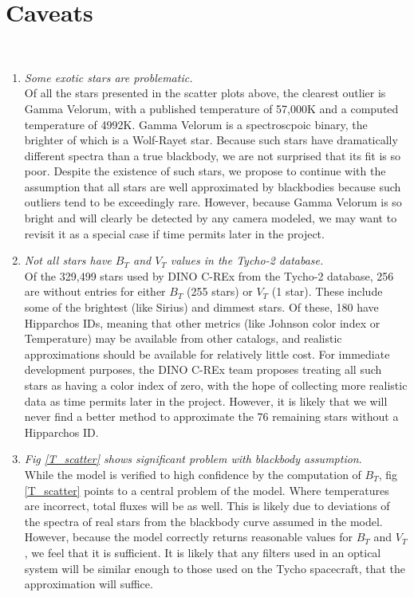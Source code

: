 \documentclass[]{DINOReportMemo}
\begin{document}
\section{Caveats} \\
\begin{enumerate}
    \item \textit{Some exotic stars are problematic.}\\
    Of all the stars presented in the scatter plots above, the clearest outlier is Gamma Velorum, with a published temperature of 57,000K and a computed temperature of 4992K. Gamma Velorum is a spectroscpoic binary, the brighter of which is a Wolf-Rayet star. Because such stars have dramatically different spectra than a true blackbody, we are not surprised that its fit is so poor. Despite the existence of such stars, we propose to continue with the assumption that all stars are well approximated by blackbodies because such outliers tend to be exceedingly rare. However, because Gamma Velorum is so bright and will clearly be detected by any camera modeled, we may want to revisit it as a special case if time permits later in the project.
    \item \textit{Not all stars have $B_T$ and $V_T$ values in the Tycho-2 database.} \\
    Of the 329,499 stars  used by DINO C-REx from the Tycho-2 database, 256 are without entries for either $B_T$ (255 stars) or $V_T$ (1 star). These include some of the brightest (like Sirius) and dimmest stars. Of these, 180 have Hipparchos IDs, meaning that other metrics (like Johnson color index or Temperature) may be available from other catalogs, and realistic approximations should be available for relatively little cost. For immediate development purposes, the DINO C-REx team proposes treating all such stars as having a color index of zero, with the hope of collecting more realistic data as time permits later in the project. However, it is likely that we will never find a better method to approximate the 76 remaining stars without a Hipparchos ID.
    \item \textit{Fig \ref{T_scatter} shows significant problem with blackbody assumption}. \\
    While the model is verified to high confidence by the computation of $B_T$, fig \ref{T_scatter} points to a central problem of the model. Where temperatures are incorrect, total fluxes will be as well. This is likely due to deviations of the spectra of real stars from the blackbody curve assumed in the model. However, because the model correctly returns reasonable values for $B_T$ and $V_T$, we feel that it is sufficient. It is likely that any filters used in an optical system will be similar enough to those used on the Tycho spacecraft, that the approximation will suffice.
\end{enumerate}
\end{document}
